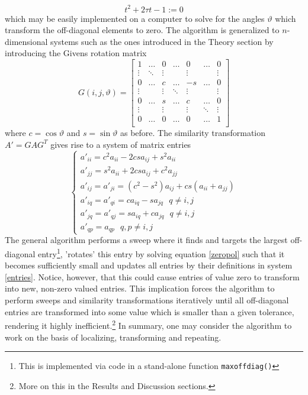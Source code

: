  	\begin{equation}
 		t^2 + 2\tau t - 1 := 0
 		\label{zeropol}
 	\end{equation}
 	which may be easily implemented on a computer to solve for the angles $\vartheta$ which transform the off-diagonal elements to zero. The algorithm is generalized to $n$-dimensional systems such as the ones introduced in the Theory section by introducing the Givens rotation matrix
 	\[
 	G(i,j,\vartheta) = 
 	\begin{bmatrix}
 	1 & \hdots & 0 & \hdots & 0 & \hdots & 0\\
 	\vdots & \ddots & \vdots & & \vdots & & \vdots\\
 	0 & \hdots & c & \hdots & -s & \hdots & 0\\
 	\vdots & & \vdots &  \ddots &  \vdots & & \vdots\\
 	0 & \hdots & s & \hdots & c & \hdots & 0\\
 	\vdots & & \vdots & & \vdots &  \ddots & \vdots\\
 	0 & \hdots & 0 & \hdots & 0 & \hdots & 1\\
 	\end{bmatrix}
 	\]
 	where $c = \cos \vartheta$ and $s = \sin \vartheta$ as before. The similarity transformation $A' = GAG^T$ gives rise to a system of matrix entries
 	\begin{equation}
 		\begin{cases}
 		a'_{ii} = c^2a_{ii} - 2csa_{ij} + s^2a_{ii}\\
 		a'_{jj} = s^2a_{ii} + 2csa_{ij} + c^2a_{jj}\\
 		a'_{ij} = a'_{ji} = \left(c^2-s^2\right)a_{ij} + cs\left(a_{ii} + a_{jj}\right)\\
 		a'_{iq} = a'_{qi} = ca_{iq} - sa_{jq} \ \ \ q \neq i,j\\
 		a'_{jq} = a'_{qj} = sa_{iq} + ca_{jq} \ \ \ q \neq i,j\\
 		a'_{qp} = a_{qp} \ \ \ q,p \neq i,j
 		\end{cases}
 		\label{entries}
 	\end{equation}
 	The general algorithm performs a sweep where it finds and targets the largest off-diagonal entry\footnote{This is implemented via code in a stand-alone function \texttt{maxoffdiag()}}, 'rotates' this entry by solving equation \eqref{zeropol} such that it becomes sufficiently small and updates all entries by their definitions in system \eqref{entries}. Notice, however, that this could cause entries of value zero to transform into new, non-zero valued entries. This implication forces the algorithm to perform sweeps and similarity transformations iteratively until all off-diagonal entries are transformed into some value which is smaller than a given tolerance, rendering it highly inefficient.\footnote{More on this in the Results and Discussion sections.} In summary, one may consider the algorithm to work on the basis of localizing, transforming and repeating. 

